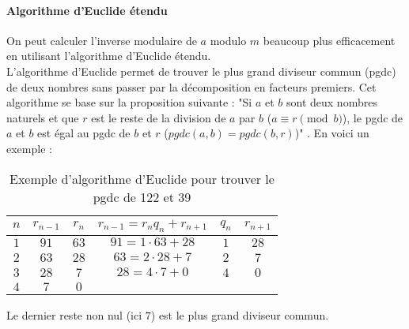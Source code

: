 \documentclass[10pt,a4paper,twoside]{article}
\numberwithin{equation}{section}
\begin{document}
			\paragraph{Algorithme d'Euclide étendu}
				On peut calculer l'inverse modulaire de $a$ modulo $m$ beaucoup plus efficacement en utilisant l'algorithme d'Euclide étendu.\\
				L'algorithme d'Euclide permet de trouver le plus grand diviseur commun (pgdc) de deux nombres sans passer par la décomposition en facteurs premiers. Cet algorithme se base sur la proposition suivante : "Si $a$ et $b$ sont deux nombres naturels et que $r$ est le reste de la division de $a$ par $b$ ($a \equiv r \pmod b$), le pgdc de $a$ et $b$ est égal au pgdc de $b$ et $r$ ($pgdc(a,b) = pgdc(b,r)$)" \cite{wiki_algorithme_euclide}. En voici un exemple :
				\begin{table}[H] 
					\centering
					\begin{tabular}{|c|c|c|c|c|c|}
						\hline
						\rowcolor{gray!40} $n$ & $r_{n-1}$ & $r_n$ & $r_{n-1} = r_n q_n + r_{n+1}$ & $q_n$ & $r_{n+1}$\\
						\hline
						$1$ & $91$ & $63$ & $91 = 1 \cdot 63 + 28$ & $1$ & $28$ \\
						\hline
						$2$ & $63$ & $28$ & $63 = 2 \cdot 28 + 7$ & $2$ & \cellcolor{yellow!40} $7$ \\
						\hline
						$3$ & $28$ & $7$ & $28 = 4 \cdot 7 + 0$ & $4$ & $0$ \\
						\hline
						$4$ & $7$ & $0$ & & & \\
						\hline
					\end{tabular}
					\caption{Exemple d'algorithme d'Euclide pour trouver le pgdc de 122 et 39} \label{example_pgdc}
				\end{table}
				Le dernier reste non nul (ici $7$) est le plus grand diviseur commun.\\
				
\end{document}
